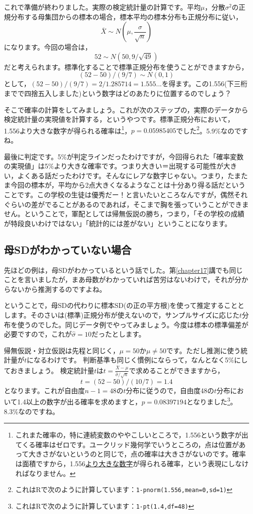\documentclass{ltjsbook}
\begin{document}
これで準備が終わりました。実際の検定統計量の計算です。平均$\mu$，分散$\sigma^2$の正規分布する母集団からの標本の場合，標本平均の標本分布も正規分布に従い，
\[ \bar{X} \sim N(\mu,\frac{\sigma}{\sqrt{n}}) \]
になります。今回の場合は，
\[ 52 \sim N(50,9/\sqrt{49}) \]
だと考えられます。標準化することで標準正規分布を使うことができますから，
\[ (52-50)/(9/7) \sim N(0,1) \]
として，$ (52-50)/(9/7) =2/1.285714=1.555... $を得ます。この1.556(下三桁までで四捨五入しました)という数字はどのあたりに位置するのでしょう？ 

そこで確率の計算をしてみましょう。これが次のステップの，実際のデータから検定統計量の実現値を計算する，というやつです。標準正規分布において，1.556より大きな数字が得られる確率は\footnote{これまた確率の，特に連続変数のややこしいところで，1.556という数字が出てくる確率はゼロです。ユークリッド幾何学でいうところの，点は位置があって大きさがないというのと同じで，点の確率は大きさがないのです。確率は面積ですから，1.556\underline{より大きな数字}が得られる確率，という表現にしなければなりません。}，$p=0.05985405$でした\footnote{これはRで次のように計算しています：\texttt{1-pnorm(1.556,mean=0,sd=1)}}。5.9\%なのですね。

最後に判定です。5\%が判定ラインだったわけですが，今回得られた「確率変数の実現値」は5\%より大きな確率です。つまり大きい＝出現する可能性が大きい，よくある話だったわけです。そんなにレアな数字じゃない。つまり，たまたま今回の標本が，平均から2点大きくなるようなことは十分あり得る話だということです。この学校の生徒は優秀だー！と言いたいところなんですが，偶然それぐらいの差がでることがあるのであれば，そこまで胸を張っていうことができません。ということで，軍配としては帰無仮説の勝ち，つまり，「その学校の成績が特段良いわけではない」「統計的には差がない」ということになります。

\subsection{母SDがわかっていない場合}
先ほどの例は，母SDがわかっているという話でした。第\ref{chapter17}講でも同じことを言いましたが，まあ母数がわかっていれば苦労はないわけで，それが分からないから推測するのですよね。

ということで，母SDの代わりに標本SD(の正の平方根)を使って推定することとします。そのさいは(標準)正規分布が使えないので，サンプルサイズに応じた$t$分布を使うのでした。同じデータ例でやってみましょう。今度は標本の標準偏差が必要ですので，これが$\hat{\sigma}=10$だったとします。

帰無仮説・対立仮説は先程と同じく，$\mu=50$か$\mu \neq 50$です。ただし推測に使う統計量が$t$になるわけです。
判断基準も同じく慣例にならって，なんとなく5\%にしておきましょう。
検定統計量$t$は$t = \frac{\bar{X}-\mu}{\hat{\sigma}/\sqrt{n}}$で求めることができますから，
\[ t = (52-50)/(10/7) = 1.4 \]
となります。これが自由度$n-1=48$の$t$分布に従うので，自由度48の$t$分布において1.4以上の数字が出る確率を求めますと，$p=0.08397194$となりました\footnote{これはRで次のように計算しています：\texttt{1-pt(1.4,df=48)}}。8.3\%なのですね。
\end{document}
